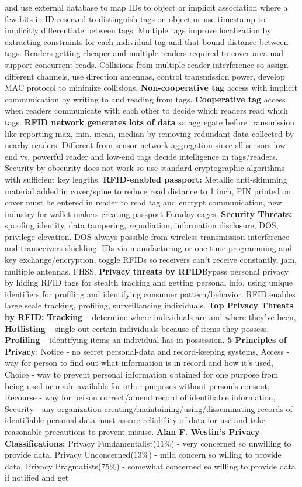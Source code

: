 \documentclass[9pt]{extarticle}
\begin{document}
\begin{multicols}{2}
and use external database to map IDs to object or implicit association where a few bits in ID reserved to distinguish tags on object or use timestamp to implicitly differentiate between tags. Multiple tags improve localization by extracting constraints for each individual tag and that bound distance between tags. Readers getting cheaper and multiple readers required to cover area nad support concurrent reads. Collisions from multiple reader interference so assign different channels, use direction antennas, control transmission power, develop MAC protocol to minimize collisions. \textbf{Non-cooperative tag} access with implicit communication by writing to and reading from tags.\textbf{ Cooperative tag} access when readers communicate with each other to decide which readers read which tags. \textbf{RFID network generates lots of data} so aggregate before transmission like reporting max, min, mean, median by removing redundant data collected by nearby readers. Different from sensor network aggregation  since sll sensors low-end vs. powerful reader and low-end tags decide intelligence in tags/readers. Security by obscurity does not work so use standard cryptographic algorithms with sufficient key lengths. \textbf{RFID-enabled passport:} Metallic anti-skimming material added in cover/spine to reduce read distance to 1 inch, PIN printed on cover must be entered in reader to read tag and encrypt communication, new industry for wallet makers creating passport Faraday cages. \textbf{Security Threats:} spoofing identity, data tampering, repudiation, information disclosure, DOS, privilege elevation. DOS always possible from wireless transmission interference and transceivers shielding. IDs via manufacturing or one time programming and key exchange/encryption, toggle RFIDs so receivers can't receive constantly, jam, multiple antennas, FHSS. \textbf{Privacy threats by RFID}Bypass personal privacy by hiding RFID tags for stealth tracking and getting personal info, using unique identifiers for profiling and identifying consumer pattern/behavior. RFID enables large scale tracking, profiling, surveillancing individuals. \textbf{Top Privacy Threats by RFID:} \textbf{Tracking} – determine where individuals are and where they've been, \textbf{Hotlisting} – single out certain individuals because of items they possess, \textbf{Profiling} – identifying items an individual has in possession. \textbf{5 Principles of Privacy}: Notice - no secret personal-data and record-keeping systems, Access - way for person to find out what information is in record and how it's used, Choice - way to prevent personal information obtained for one purpose from being used or made available for other purposes without person’s consent, Recourse - way for person correct/amend record of identifiable information, Security - any organization creating/maintaining/using/disseminating records of identifiable personal data must assure reliability of data for use and take reasonable precautions to prevent misuse. \textbf{Alan F. Westin’s Privacy Classifications:} Privacy Fundamentalist($11\%$) - very concerned so unwilling to provide data, Privacy Unconcerned($13\%$) - mild concern so willing to provide data, Privacy Pragmatists($75\%$) - somewhat concerned so willing to provide data if notified and get 
\end{multicols}
\end{document}
